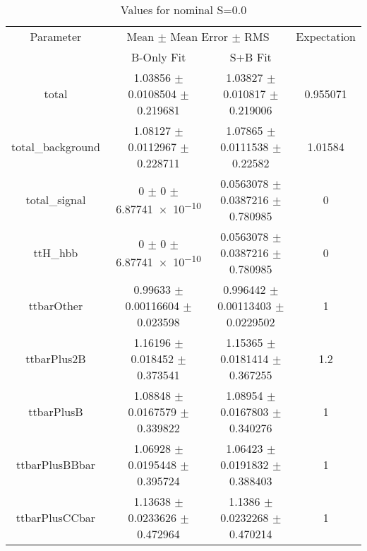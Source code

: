 \begin{table}
\centering
\caption{Values for nominal S=0.0}
\begin{tabular}{cccc}
\toprule
Parameter & \multicolumn{2}{c}{Mean $\pm$ Mean Error $\pm$ RMS} & Expectation\\
 & B-Only Fit & S+B Fit & \\
\midrule
total & \num{1.03856} $\pm$ \num{0.0108504} $\pm$ \num{0.219681} & \num{1.03827} $\pm$ \num{0.010817} $\pm$ \num{0.219006} & \num{0.955071}\\
total\_background & \num{1.08127} $\pm$ \num{0.0112967} $\pm$ \num{0.228711} & \num{1.07865} $\pm$ \num{0.0111538} $\pm$ \num{0.22582} & \num{1.01584}\\
total\_signal & \num{0} $\pm$ \num{0} $\pm$ \num{6.87741e-10} & \num{0.0563078} $\pm$ \num{0.0387216} $\pm$ \num{0.780985} & \num{0}\\
ttH\_hbb & \num{0} $\pm$ \num{0} $\pm$ \num{6.87741e-10} & \num{0.0563078} $\pm$ \num{0.0387216} $\pm$ \num{0.780985} & \num{0}\\
ttbarOther & \num{0.99633} $\pm$ \num{0.00116604} $\pm$ \num{0.023598} & \num{0.996442} $\pm$ \num{0.00113403} $\pm$ \num{0.0229502} & \num{1}\\
ttbarPlus2B & \num{1.16196} $\pm$ \num{0.018452} $\pm$ \num{0.373541} & \num{1.15365} $\pm$ \num{0.0181414} $\pm$ \num{0.367255} & \num{1.2}\\
ttbarPlusB & \num{1.08848} $\pm$ \num{0.0167579} $\pm$ \num{0.339822} & \num{1.08954} $\pm$ \num{0.0167803} $\pm$ \num{0.340276} & \num{1}\\
ttbarPlusBBbar & \num{1.06928} $\pm$ \num{0.0195448} $\pm$ \num{0.395724} & \num{1.06423} $\pm$ \num{0.0191832} $\pm$ \num{0.388403} & \num{1}\\
ttbarPlusCCbar & \num{1.13638} $\pm$ \num{0.0233626} $\pm$ \num{0.472964} & \num{1.1386} $\pm$ \num{0.0232268} $\pm$ \num{0.470214} & \num{1}\\
\bottomrule
\end{tabular}
\end{table}